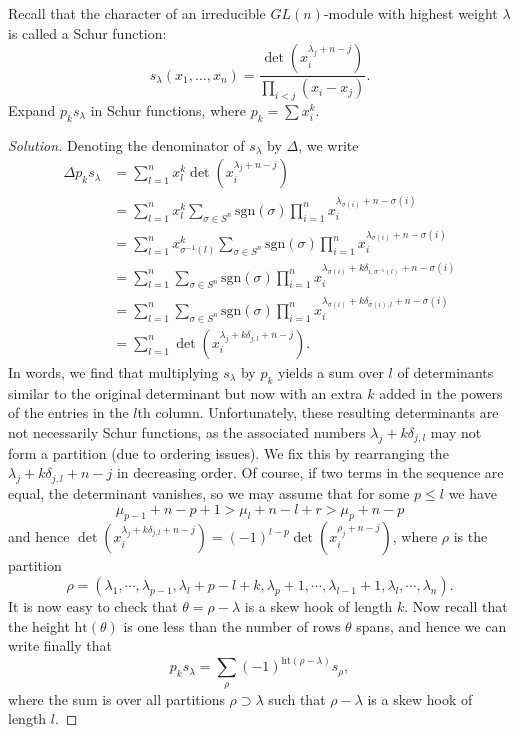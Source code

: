\documentclass{../../mathnotes}
\begin{document}
\newpage

\begin{exc}
    Recall that the character of an irreducible $GL(n)$-module with highest weight $\lambda$
    is called a Schur function:
    \[s_\lambda(x_1,\ldots,x_n)=\frac{\det\left( x_i^{\lambda_j+n-j} \right)}{\prod_{i<j}(x_i-x_j)}.\]
    Expand $p_ks_\lambda$ in Schur functions, where $p_k=\sum x_i^k$.
\end{exc}
\begin{proof}[Solution]
    Denoting the denominator of $s_\lambda$ by $\Delta$, we write
    \begin{align*}
        \Delta p_ks_\lambda &= \sum_{l=1}^nx_l^k\det\left( x_i^{\lambda_j+n-j} \right)\\
        &=\sum_{l=1}^nx_l^k\sum_{\sigma\in S^n}\text{sgn}(\sigma)\prod_{i=1}^nx_i^{\lambda_{\sigma(i)}+n-\sigma(i)}\\
        &=\sum_{l=1}^nx_{\sigma^{-1}(l)}^k\sum_{\sigma\in S^n}\text{sgn}(\sigma)\prod_{i=1}^nx_i^{\lambda_{\sigma(i)}+n-\sigma(i)}\\
        &=\sum_{l=1}^n\sum_{\sigma\in S^n}\text{sgn}(\sigma)\prod_{i=1}^nx_i^{\lambda_{\sigma(i)}+k\delta_{i,\sigma^{-1}(l)}+n-\sigma(i)}\\
        &=\sum_{l=1}^n\sum_{\sigma\in S^n}\text{sgn}(\sigma)\prod_{i=1}^nx_i^{\lambda_{\sigma(i)}+k\delta_{\sigma(i),l}+n-\sigma(i)}\\
        &=\sum_{l=1}^n\det\left( x_i^{\lambda_j+k\delta_{j,l}+n-j} \right).
    \end{align*}
    In words, we find that multiplying $s_\lambda$ by $p_k$ yields a sum over $l$ of determinants similar
    to the original determinant but now with an extra $k$ added in the powers of the entries in the $l$th column.
    Unfortunately, these resulting determinants are not necessarily Schur functions, as the associated
    numbers $\lambda_j+k\delta_{j,l}$ may not form a partition (due to ordering issues). We fix this by
    rearranging the $\lambda_j+k\delta_{j,l}+n-j$ in decreasing order. Of course, if two terms in the 
    sequence are equal, the determinant vanishes, so we may assume that for some $p\leq l$ we have
    \[\mu_{p-1}+n-p+1>\mu_l+n-l+r>\mu_p+n-p\]
    and hence $\det\left( x_i^{\lambda_j+k\delta_{j,l}+n-j} \right)=(-1)^{l-p}\det\left( x_i^{\rho_j+n-j} \right)$, where
    $\rho$ is the partition
    \[\rho=(\lambda_1,\cdots,\lambda_{p-1},\lambda_l+p-l+k,\lambda_p+1,\cdots,\lambda_{l-1}+1,\lambda_l,\cdots,\lambda_n).\]
    It is now easy to check that $\theta=\rho-\lambda$ is a skew hook of length $k$. Now recall that
    the height $\text{ht}(\theta)$ is one less than the number of rows $\theta$ spans, and hence we can write
    finally that
    \[p_ks_\lambda=\sum_\rho(-1)^{\text{ht}(\rho-\lambda)}s_\rho,\]
    where the sum is over all partitions $\rho\supset\lambda$ such that $\rho-\lambda$ is a skew hook of length $l$.
\end{proof}
\end{document}
